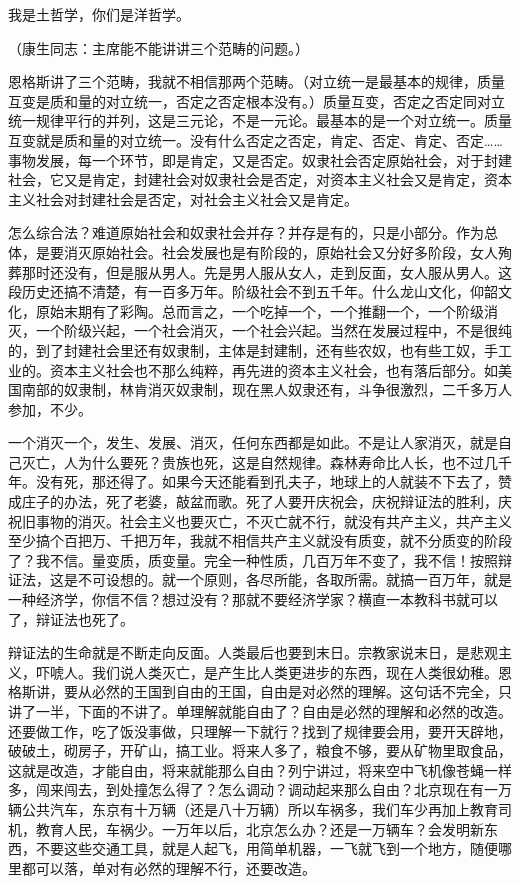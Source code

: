 我是土哲学，你们是洋哲学。

（康生同志：主席能不能讲讲三个范畴的问题。）

恩格斯讲了三个范畴，我就不相信那两个范畴。（对立统一是最基本的规律，质量互变是质和量的对立统一，否定之否定根本没有。）质量互变，否定之否定同对立统一规律平行的并列，这是三元论，不是一元论。最基本的是一个对立统一。质量互变就是质和量的对立统一。没有什么否定之否定，肯定、否定、肯定、否定……事物发展，每一个环节，即是肯定，又是否定。奴隶社会否定原始社会，对于封建社会，它又是肯定，封建社会对奴隶社会是否定，对资本主义社会又是肯定，资本主义社会对封建社会是否定，对社会主义社会又是肯定。

怎么综合法？难道原始社会和奴隶社会并存？并存是有的，只是小部分。作为总体，是要消灭原始社会。社会发展也是有阶段的，原始社会又分好多阶段，女人殉葬那时还没有，但是服从男人。先是男人服从女人，走到反面，女人服从男人。这段历史还搞不清楚，有一百多万年。阶级社会不到五千年。什么龙山文化，仰韶文化，原始末期有了彩陶。总而言之，一个吃掉一个，一个推翻一个，一个阶级消灭，一个阶级兴起，一个社会消灭，一个社会兴起。当然在发展过程中，不是很纯的，到了封建社会里还有奴隶制，主体是封建制，还有些农奴，也有些工奴，手工业的。资本主义社会也不那么纯粹，再先进的资本主义社会，也有落后部分。如美国南部的奴隶制，林肯消灭奴隶制，现在黑人奴隶还有，斗争很激烈，二千多万人参加，不少。

一个消灭一个，发生、发展、消灭，任何东西都是如此。不是让人家消灭，就是自己灭亡，人为什么要死？贵族也死，这是自然规律。森林寿命比人长，也不过几千年。没有死，那还得了。如果今天还能看到孔夫子，地球上的人就装不下去了，赞成庄子的办法，死了老婆，敲盆而歌。死了人要开庆祝会，庆祝辩证法的胜利，庆祝旧事物的消灭。社会主义也要灭亡，不灭亡就不行，就没有共产主义，共产主义至少搞个百把万、千把万年，我就不相信共产主义就没有质变，就不分质变的阶段了？我不信。量变质，质变量。完全一种性质，几百万年不变了，我不信！按照辩证法，这是不可设想的。就一个原则，各尽所能，各取所需。就搞一百万年，就是一种经济学，你信不信？想过没有？那就不要经济学家？横直一本教科书就可以了，辩证法也死了。

辩证法的生命就是不断走向反面。人类最后也要到末日。宗教家说末日，是悲观主义，吓唬人。我们说人类灭亡，是产生比人类更进步的东西，现在人类很幼稚。恩格斯讲，要从必然的王国到自由的王国，自由是对必然的理解。这句话不完全，只讲了一半，下面的不讲了。单理解就能自由了？自由是必然的理解和必然的改造。还要做工作，吃了饭没事做，只理解一下就行？找到了规律要会用，要开天辟地，破破土，砌房子，开矿山，搞工业。将来人多了，粮食不够，要从矿物里取食品，这就是改造，才能自由，将来就能那么自由？列宁讲过，将来空中飞机像苍蝇一样多，闯来闯去，到处撞怎么得了？怎么调动？调动起来那么自由？北京现在有一万辆公共汽车，东京有十万辆（还是八十万辆）所以车祸多，我们车少再加上教育司机，教育人民，车祸少。一万年以后，北京怎么办？还是一万辆车？会发明新东西，不要这些交通工具，就是人起飞，用简单机器，一飞就飞到一个地方，随便哪里都可以落，单对有必然的理解不行，还要改造。

